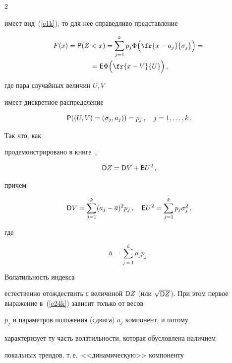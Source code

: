 \begin{multicols}{2}
\begin{enumerate}[($i$)]
имеет вид~(\ref{e1k}), то для нее справедливо пред\-став\-ле\-ние


\begin{multline*}


F(x)={\sf


P}(Z<x)=\sum_{j=1}^kp_j\Phi\Big(\fr{x-a_j}{\sigma_j}\Big)={}\\


{}={\sf


E}\Phi\Big(\fr{x-V}{U}\Big)\,,


\end{multline*}


где пара случайных величин $U,V$


имеет дискретное распределение


$$


{\sf P}((U,V)=(\sigma_j,a_j))=p_j\,,\quad  j=1,\ldots,k\,.


$$


Так что, как


продемонстрировано в книге~\cite{2k},


\begin{equation}


{\sf D}Z={\sf D}V+{\sf E}U^2\,,\label{e23k}


\end{equation}


причем


\begin{equation}


{\sf D}V=\sum_{j=1}^k(a_j-\overline


a)^2p_j\,,\quad {\sf E}U^2=\sum_{j=1}^kp_j\sigma_j^2\,,\label{e24k}


\end{equation}


где


$$


\overline a=\sum_{j=1}^ka_jp_j\,.


$$


Волатильность индекса


естественно отождествить с величиной ${\sf D}Z$ (или $\sqrt{{\sf


D}Z}$). При этом первое выражение в~(\ref{e24k}) зависит только от весов


$p_j$ и параметров положения (сдвига) $a_j$ компонент, и потому


характеризует ту часть волатильности, которая обусловлена наличием


локальных трендов, т.\,е.\ <<динамическую>> компоненту



\end{enumerate}
\end{multicols}
